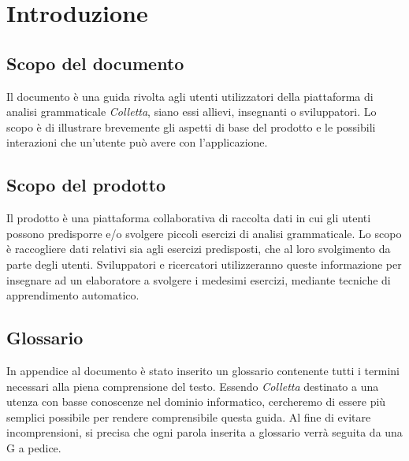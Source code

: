 \section{Introduzione}
\subsection{Scopo del documento}
Il documento \`e una guida rivolta agli utenti utilizzatori della piattaforma di analisi grammaticale \textit{Colletta}, siano essi allievi, insegnanti o sviluppatori. Lo scopo è di illustrare brevemente gli aspetti di base del prodotto e le possibili interazioni che un'utente può avere con l'applicazione.
\subsection{Scopo del prodotto}
Il prodotto è una piattaforma collaborativa di raccolta dati in cui gli utenti possono predisporre e/o svolgere piccoli esercizi di analisi grammaticale. Lo scopo è raccogliere dati relativi sia  agli esercizi predisposti, che al loro svolgimento da parte degli utenti. Sviluppatori e ricercatori utilizzeranno queste informazione per insegnare ad un elaboratore a svolgere i medesimi esercizi, mediante tecniche di apprendimento automatico.
\subsection{Glossario}
In appendice al documento \`e stato inserito un glossario contenente tutti i termini necessari alla piena comprensione del testo. Essendo \textit{Colletta} destinato a una utenza con basse conoscenze nel dominio informatico, cercheremo di essere più semplici possibile per rendere comprensibile questa guida. Al fine di evitare incomprensioni, si precisa che ogni parola inserita a glossario verrà seguita da una G a pedice.

